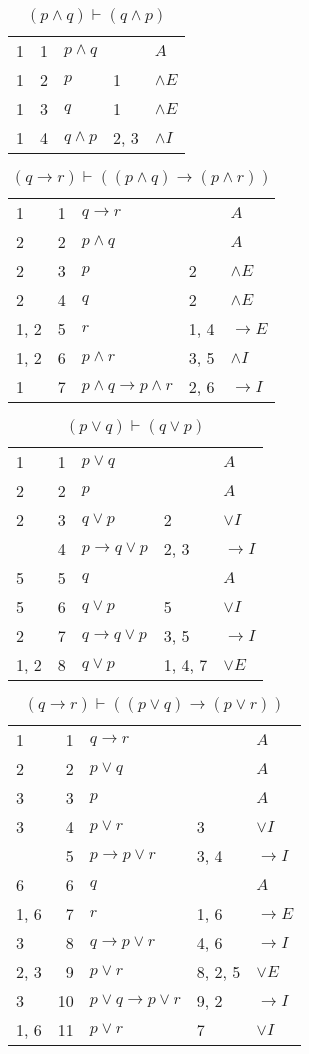 \documentclass{article}
\begin{document}
\begin{table}[htbp]\caption*{$(p ∧ q) ⊢ (q ∧ p)$}\centering\begin{tabular}{lrlll}
		{1} & 1 & $p∧q$ & {} & $A$ \\
		{1} & 2 & $p$ & {1} & $∧E$ \\
		{1} & 3 & $q$ & {1} & $∧E$ \\
		{1} & 4 & $q∧p$ & {2, 3} & $∧I$ \\
	\end{tabular}
\end{table}
\begin{table}[htbp]\caption*{$(q → r) ⊢ ((p ∧ q) → (p ∧ r))$}\centering\begin{tabular}{lrlll}
		{1} & 1 & $q→r$ & {} & $A$ \\
		{2} & 2 & $p∧q$ & {} & $A$ \\
		{2} & 3 & $p$ & {2} & $∧E$ \\
		{2} & 4 & $q$ & {2} & $∧E$ \\
		{1, 2} & 5 & $r$ & {1, 4} & $→E$ \\
		{1, 2} & 6 & $p∧r$ & {3, 5} & $∧I$ \\
		{1} & 7 & $p∧q→p∧r$ & {2, 6} & $→I$ \\
	\end{tabular}
\end{table}
\begin{table}[htbp]\caption*{$(p∨q) ⊢ (q∨p)$}\centering\begin{tabular}{lrlll}
		{1} & 1 & $p∨q$ & {} & $A$ \\
		{2} & 2 & $p$ & {} & $A$ \\
		{2} & 3 & $q∨p$ & {2} & $∨I$ \\
		{} & 4 & $p→q∨p$ & {2, 3} & $→I$ \\
		{5} & 5 & $q$ & {} & $A$ \\
		{5} & 6 & $q∨p$ & {5} & $∨I$ \\
		{2} & 7 & $q→q∨p$ & {3, 5} & $→I$ \\
		{1, 2} & 8 & $q∨p$ & {1, 4, 7} & $∨E$ \\
	\end{tabular}
\end{table}
\begin{table}[htbp]\caption*{$(q→r) ⊢ ((p∨q)→(p∨r))$}\centering\begin{tabular}{lrlll}
		{1} & 1 & $q→r$ & {} & $A$ \\
		{2} & 2 & $p∨q$ & {} & $A$ \\
		{3} & 3 & $p$ & {} & $A$ \\
		{3} & 4 & $p∨r$ & {3} & $∨I$ \\
		{} & 5 & $p→p∨r$ & {3, 4} & $→I$ \\
		{6} & 6 & $q$ & {} & $A$ \\
		{1, 6} & 7 & $r$ & {1, 6} & $→E$ \\
		{3} & 8 & $q→p∨r$ & {4, 6} & $→I$ \\
		{2, 3} & 9 & $p∨r$ & {8, 2, 5} & $∨E$ \\
		{3} & 10 & $p∨q→p∨r$ & {9, 2} & $→I$ \\
		{1, 6} & 11 & $p∨r$ & {7} & $∨I$ \\
	\end{tabular}
\end{table}
\end{document}
